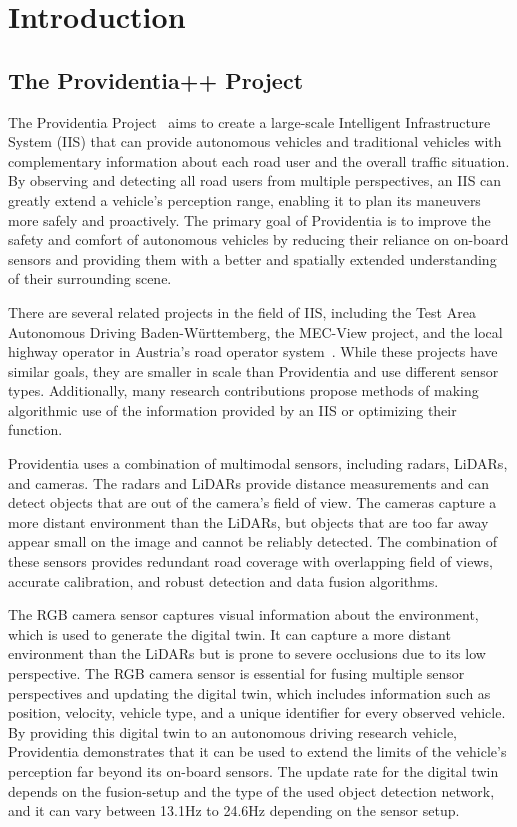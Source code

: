
\chapter{Introduction}
\label{ch:intro}

\section{The Providentia++ Project}
\label{sec:providentia}

The Providentia Project~\cite{krammer2022providentia} aims to create a large-scale Intelligent Infrastructure System (IIS) that can provide autonomous vehicles and traditional vehicles with complementary information about each road user and the overall traffic situation.
By observing and detecting all road users from multiple perspectives, an IIS can greatly extend a vehicle's perception range, enabling it to plan its maneuvers more safely and proactively.
The primary goal of Providentia is to improve the safety and comfort of autonomous vehicles by reducing their reliance on on-board sensors and providing them with a better and spatially extended understanding of their surrounding scene.

There are several related projects in the field of IIS, including the Test Area Autonomous Driving Baden-Württemberg, the MEC-View project, and the local highway operator in Austria's road operator system~\cite{DBLP:journals/corr/abs-2112-05615}.
While these projects have similar goals, they are smaller in scale than Providentia and use different sensor types.
Additionally, many research contributions propose methods of making algorithmic use of the information provided by an IIS or optimizing their function.

Providentia uses a combination of multimodal sensors, including radars, LiDARs, and cameras.
The radars and LiDARs provide distance measurements and can detect objects that are out of the camera's field of view.
The cameras capture a more distant environment than the LiDARs, but objects that are too far away appear small on the image and cannot be reliably detected.
The combination of these sensors provides redundant road coverage with overlapping field of views, accurate calibration, and robust detection and data fusion algorithms.

The RGB camera sensor captures visual information about the environment, which is used to generate the digital twin.
It can capture a more distant environment than the LiDARs but is prone to severe occlusions due to its low perspective.
The RGB camera sensor is essential for fusing multiple sensor perspectives and updating the digital twin, which includes information such as position, velocity, vehicle type, and a unique identifier for every observed vehicle.
By providing this digital twin to an autonomous driving research vehicle, Providentia demonstrates that it can be used to extend the limits of the vehicle’s perception far beyond its on-board sensors.
The update rate for the digital twin depends on the fusion-setup and the type of the used object detection network, and it can vary between 13.1Hz to 24.6Hz depending on the sensor setup.

